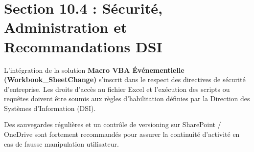 \documentclass[12pt,a4paper]{report}
\begin{document}
\section{Section 10.4 : Sécurité, Administration et Recommandations DSI}
L'intégration de la solution \textbf{Macro VBA Événementielle (Workbook\_SheetChange)} s'inscrit dans le respect des directives de sécurité d'entreprise. Les droits d'accès au fichier Excel et l'exécution des scripts ou requêtes doivent être soumis aux règles d'habilitation définies par la Direction des Systèmes d'Information (DSI).

Des sauvegardes régulières et un contrôle de versioning sur SharePoint / OneDrive sont fortement recommandés pour assurer la continuité d'activité en cas de fausse manipulation utilisateur.
\end{document}
